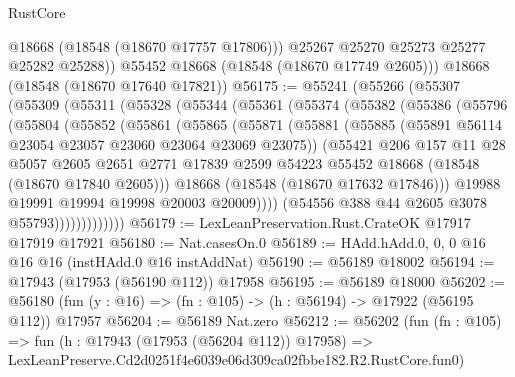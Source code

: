 \begin{lexlean}{RustCore}
\begin{coremodule}
            @18668
            (@18548 (@18670 @17757 @17806)))
          @25267
          @25270
          @25273
          @25277
          @25282
          @25288))
      @55452
      @18668
      (@18548 (@18670 @17749 @2605)))
    @18668
    (@18548 (@18670 @17640 @17821))
@56175 := @55241
    (@55266
      (@55307
        (@55309
          (@55311
            (@55328
              (@55344
                (@55361
                  (@55374
                    (@55382
                      (@55386
                        (@55796
                          (@55804
                            (@55852
                              (@55861
                                (@55865
                                  (@55871
                                    (@55881
                                      (@55885
                                        (@55891 @56114 @23054 @23057 @23060 @23064 @23069 @23075))
                                      (@55421
                                        @206
                                        @157
                                        @11
                                        @28
                                        @5057
                                        @2605
                                        @2651
                                        @2771
                                        @17839
                                        @2599
                                        @54223
                                        @55452
                                        @18668
                                        (@18548 (@18670 @17840 @2605)))
                                      @18668
                                      (@18548 (@18670 @17632 @17846)))
                                    @19988
                                    @19991
                                    @19994
                                    @19998
                                    @20003
                                    @20009))))
                            (@54556 @388 @44 @2605 @3078 @55793)))))))))))))
@56179 := LexLeanPreservation.Rust.CrateOK @17917 @17919 @17921
@56180 := Nat.casesOn.{0}
@56189 := HAdd.hAdd.{0, 0, 0} @16 @16 @16 (instHAdd.{0} @16 instAddNat)
@56190 := @56189 @18002
@56194 := @17943 (@17953 (@56190 @112)) @17958
@56195 := @56189 @18000
@56202 := @56180 (fun (y : @16) => (fn : @105) -> (h : @56194) -> @17922 (@56195 @112)) @17957
@56204 := @56189 Nat.zero
@56212 := @56202
    (fun (fn : @105) =>
    fun (h : @17943 (@17953 (@56204 @112)) @17958) =>
    LexLeanPreserve.Cd2d0251f4e6039e06d309ca02fbbe182.R2.RustCore.fun0)

\end{coremodule}
\end{lexlean}
